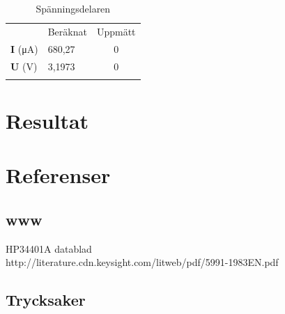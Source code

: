 \documentclass[11pt,a4paper]{article}
\begin{document}
\begin{table}
    \begin{longtable}[c]{@{}llc@{}}
        \toprule\addlinespace
                              & Beräknat & Uppmätt
        \\\addlinespace
        \midrule\endhead
        \textbf{I} (\si{\uA}) & 680,27   & 0
        \\\addlinespace
        \textbf{U} (\si{\V})  & 3,1973   & 0
        \\\addlinespace
        \bottomrule
        \addlinespace
        \caption{Spänningsdelaren}
        \label{vdivtable}
    \end{longtable}
\end{table}


\section{Resultat}\label{setup}


\newpage

\section{Referenser}\label{refs}

\subsection{www}\label{interwebs}
HP34401A datablad\\
http://literature.cdn.keysight.com/litweb/pdf/5991-1983EN.pdf

\subsection{Trycksaker}\label{literature} %


\end{document}
